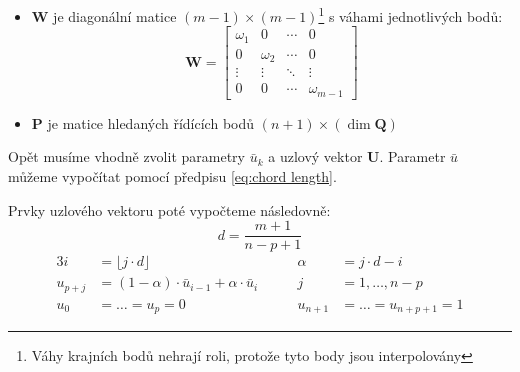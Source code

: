 \begin{itemize}
\begin{itemize}
\begin{equation}
\begin{bmatrix}
                        \end{bmatrix} \\
                    \end{equation}
                    kde
                    \begin{equation}
                        \bm{R}_k  = \bm{Q}_k - N_{0, p}(\bar{u}_k)\bm{Q}_0 - N_{n,p}(\bar{u}_k)\bm{Q}_m \quad\quad k = 1, \ldots, m -1
                    \end{equation}
              \item $\bm{W}$ je diagonální matice $(m - 1) \times (m - 1)$\footnote{Váhy
                        krajních bodů nehrají roli, protože tyto body jsou interpolovány}
                    s váhami jednotlivých bodů:
                    \begin{equation}
                        \bm{W}  = \begin{bmatrix}
                            \omega_1 & 0        & \cdots & 0            \\
                            0        & \omega_2 & \cdots & 0            \\
                            \vdots   & \vdots   & \ddots & \vdots       \\
                            0        & 0        & \cdots & \omega_{m-1}
                        \end{bmatrix}
                    \end{equation}
              \item $\bm{P}$ je matice hledaných řídících bodů $(n + 1)\times(\dim\bm{Q})$

          \end{itemize}
\end{itemize}
Opět musíme vhodně zvolit parametry $\bar{u}_k$ a uzlový vektor $\bm{U}$. Parametr $\bar{u}$
můžeme vypočítat pomocí předpisu \ref{eq:chord length}.
\par Prvky uzlového vektoru poté vypočteme následovně:
\begin{equation}
    d = \frac{m + 1}{n - p + 1}
\end{equation}
\begin{alignat}{3}
    i         & = \lfloor j \cdot d \rfloor                                 & \quad\quad \alpha    & = j \cdot d - i              \\
    u_{p + j} & = (1 - \alpha)\cdot\bar{u}_{i - 1} + \alpha \cdot \bar{u}_i & \quad\quad j         & = 1, \ldots, n - p           \\
    u_0       & = \ldots = u_p = 0 \quad\quad                               & \quad\quad u_{n + 1} & = \ldots = u_{n + p + 1} = 1
\end{alignat}

